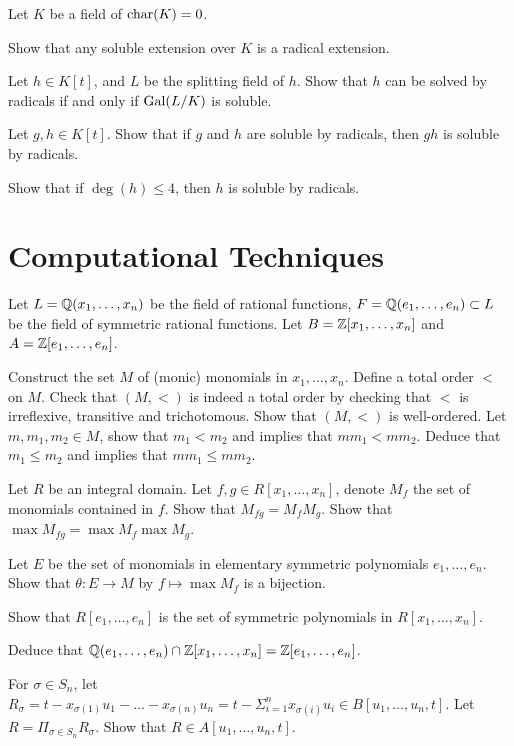 \begin{question}{40}
    Let $K$ be a field of $\text{char}(K) = 0$. 
    
    Show that any soluble extension over $K$ is a radical extension. 
    
    Let $h \in K[t]$, and $L$ be the splitting field of $h$. Show that $h$ can be solved by radicals if and only if $\text{Gal}(L/K)$ is soluble. 

    Let $g,h \in K[t]$. Show that if $g$ and $h$ are soluble by radicals, then $gh$ is soluble by radicals.
    
    Show that if $\deg(h) \leq 4$, then $h$ is soluble by radicals.   
\end{question}

\section{Computational Techniques}
Let $L = \mathbb{Q}(x_1,\dots,x_n)$ be the field of rational functions, $F = \mathbb{Q}(e_1,\dots,e_n) \subset L$ be the field of symmetric rational functions. Let $B = \mathbb{Z}[x_1,\dots,x_n]$ and $A = \mathbb{Z}[e_1,\dots,e_n]$.

\begin{question}{41}
     Construct the set $M$ of (monic) monomials in $x_1,\dots,x_n$. Define a total order $<$ on $M$. Check that $(M,<)$ is indeed a total order by checking that $<$ is irreflexive, transitive and trichotomous. Show that $(M,<)$ is well-ordered. Let $m,m_1,m_2 \in M$, show that $m_1 < m_2$ and  implies that $m m_1 < m m_2$. Deduce that $m_1 \leq m_2$ and  implies that $m m_1 \leq m m_2$.
    
    Let $R$ be an integral domain. Let $f, g\in R[x_1,\dots,x_n]$, denote $M_f$ the set of monomials contained in $f$. Show that $M_{fg} = M_f M_g$. Show that $\max M_{fg} = \max M_f \max M_g$.

    Let $E$ be the set of monomials in elementary symmetric polynomials $e_1,\dots,e_n$. Show that $\theta : E \rightarrow M$ by $f \mapsto \max M_f$ is a bijection.
    
    Show that $R[e_1,\dots,e_n]$ is the set of symmetric polynomials in $R[x_1,\dots,x_n]$.

    Deduce that $\mathbb{Q}(e_1,\dots,e_n) \cap \mathbb{Z}[x_1,\dots,x_n] = \mathbb{Z}[e_1,\dots,e_n]$.
\end{question}

\begin{question}{42}
    For $\sigma \in S_n$, let $R_\sigma = t -x_{\sigma(1)}u_1 - \dots -x_{\sigma(n)} u_n = t - \Sigma_{i = 1}^n x_{\sigma(i)} u_i \in B[u_1,\dots,u_n,t]$.
    Let $R = \Pi_{\sigma \in S_n} R_\sigma$. Show that $R \in A[u_1,\dots,u_n,t]$.
\end{question}

